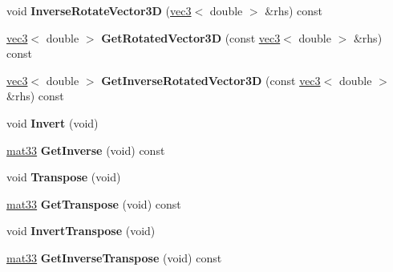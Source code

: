 \begin{DoxyCompactItemize}
\item 
\hypertarget{classmath_1_1mat33_a3957968de1abd983d3394009ecfeff5f}{
void {\bfseries InverseRotateVector3D} (\hyperlink{classmath_1_1vec3}{vec3}$<$ double $>$ \&rhs) const }
\label{classmath_1_1mat33_a3957968de1abd983d3394009ecfeff5f}

\item 
\hypertarget{classmath_1_1mat33_a3ec25bfe77c1219c5deed170f9137a2b}{
\hyperlink{classmath_1_1vec3}{vec3}$<$ double $>$ {\bfseries GetRotatedVector3D} (const \hyperlink{classmath_1_1vec3}{vec3}$<$ double $>$ \&rhs) const }
\label{classmath_1_1mat33_a3ec25bfe77c1219c5deed170f9137a2b}

\item 
\hypertarget{classmath_1_1mat33_ab662d330af3a9d33898ce42a61a2f025}{
\hyperlink{classmath_1_1vec3}{vec3}$<$ double $>$ {\bfseries GetInverseRotatedVector3D} (const \hyperlink{classmath_1_1vec3}{vec3}$<$ double $>$ \&rhs) const }
\label{classmath_1_1mat33_ab662d330af3a9d33898ce42a61a2f025}

\item 
\hypertarget{classmath_1_1mat33_a579ecdf322cce60f987d8e9ad78c89e5}{
void {\bfseries Invert} (void)}
\label{classmath_1_1mat33_a579ecdf322cce60f987d8e9ad78c89e5}

\item 
\hypertarget{classmath_1_1mat33_a17625c5cce1d6f0664bea6f9eeeed354}{
\hyperlink{classmath_1_1mat33}{mat33} {\bfseries GetInverse} (void) const }
\label{classmath_1_1mat33_a17625c5cce1d6f0664bea6f9eeeed354}

\item 
\hypertarget{classmath_1_1mat33_af1a3cbfd8342132a259f9b96b8c621f3}{
void {\bfseries Transpose} (void)}
\label{classmath_1_1mat33_af1a3cbfd8342132a259f9b96b8c621f3}

\item 
\hypertarget{classmath_1_1mat33_ace5dc31390092c96a38106ef9e12609a}{
\hyperlink{classmath_1_1mat33}{mat33} {\bfseries GetTranspose} (void) const }
\label{classmath_1_1mat33_ace5dc31390092c96a38106ef9e12609a}

\item 
\hypertarget{classmath_1_1mat33_acde640f132336a5fed17d0a954c4df79}{
void {\bfseries InvertTranspose} (void)}
\label{classmath_1_1mat33_acde640f132336a5fed17d0a954c4df79}

\item 
\hypertarget{classmath_1_1mat33_af2e48f188af637b737a4ccdad0a8e796}{
\hyperlink{classmath_1_1mat33}{mat33} {\bfseries GetInverseTranspose} (void) const }
\label{classmath_1_1mat33_af2e48f188af637b737a4ccdad0a8e796}


\end{DoxyCompactItemize}
